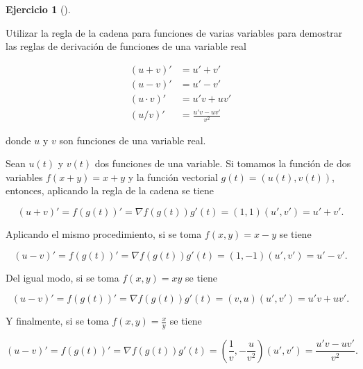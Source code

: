 \documentclass[
  spanish,
  a4paper,
]{scrreport}
\theoremstyle{definition}
\newtheorem{exercise}{Ejercicio}[chapter]
\theoremstyle{remark}
\begin{document}
\begin{exercise}[]\protect\hypertarget{exr-reglas-derivacion}{}\label{exr-reglas-derivacion}

Utilizar la regla de la cadena para funciones de varias variables para
demostrar las reglas de derivación de funciones de una variable real

\begin{align*}
(u+v)' &= u' + v'\\
(u-v)' &= u' - v'\\
(u\cdot v)' &= u'v + uv'\\
(u/v)' &= \frac{u'v-uv'}{v^2}
\end{align*}

donde \(u\) y \(v\) son funciones de una variable real.

\end{exercise}

\begin{tcolorbox}[enhanced jigsaw, arc=.35mm, bottomrule=.15mm, bottomtitle=1mm, breakable, colback=white, colbacktitle=quarto-callout-tip-color!10!white, colframe=quarto-callout-tip-color-frame, coltitle=black, left=2mm, leftrule=.75mm, opacityback=0, opacitybacktitle=0.6, rightrule=.15mm, title=\textcolor{quarto-callout-tip-color}{\faLightbulb}\hspace{0.5em}{Solución}, titlerule=0mm, toprule=.15mm, toptitle=1mm]

Sean \(u(t)\) y \(v(t)\) dos funciones de una variable. Si tomamos la
función de dos variables \(f(x+y) = x+y\) y la función vectorial
\(g(t) = (u(t), v(t))\), entonces, aplicando la regla de la cadena se
tiene

\[
(u + v)' 
= f(g(t))' 
= \nabla f(g(t)) g'(t) 
= (1, 1)(u', v') = u' + v'.
\]

Aplicando el mismo procedimiento, si se toma \(f(x,y) = x-y\) se tiene

\[
(u - v)' 
= f(g(t))' 
= \nabla f(g(t)) g'(t) 
= (1, -1)(u', v') = u' - v'.
\]

Del igual modo, si se toma \(f(x,y) = xy\) se tiene

\[
(u - v)' 
= f(g(t))' 
= \nabla f(g(t)) g'(t) 
= (v, u)(u', v') = u'v + uv'.
\]

Y finalmente, si se toma \(f(x,y) = \frac{x}{y}\) se tiene

\[
(u - v)' 
= f(g(t))' 
= \nabla f(g(t)) g'(t) 
= \left(\frac{1}{v}, -\frac{u}{v^2}\right)(u', v') = \frac{u'v-uv'}{v^2}.
\]

\end{tcolorbox}
\end{document}

